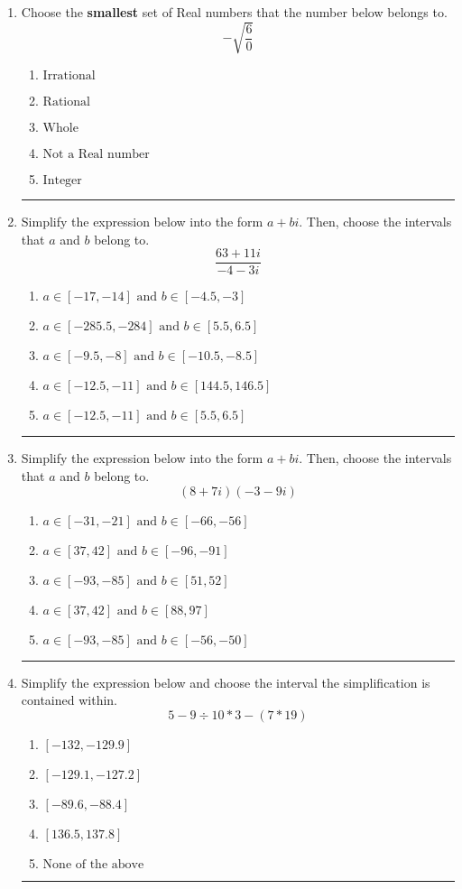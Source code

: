 \documentclass[14pt]{extbook}
\newcommand{\litem}[1]{\item#1\hspace*{-1cm}\rule{\textwidth}{0.4pt}}
\begin{document}
\begin{enumerate}
{\begin{enumerate}[label=\Alph*.]
\end{enumerate} }
\litem{
Choose the \textbf{smallest} set of Real numbers that the number below belongs to.\[ -\sqrt{\frac{6}{0}} \]\begin{enumerate}[label=\Alph*.]
\item \( \text{Irrational} \)
\item \( \text{Rational} \)
\item \( \text{Whole} \)
\item \( \text{Not a Real number} \)
\item \( \text{Integer} \)

\end{enumerate} }
\litem{
Simplify the expression below into the form $a+bi$. Then, choose the intervals that $a$ and $b$ belong to.\[ \frac{63 + 11 i}{-4 - 3 i} \]\begin{enumerate}[label=\Alph*.]
\item \( a \in [-17, -14] \text{ and } b \in [-4.5, -3] \)
\item \( a \in [-285.5, -284] \text{ and } b \in [5.5, 6.5] \)
\item \( a \in [-9.5, -8] \text{ and } b \in [-10.5, -8.5] \)
\item \( a \in [-12.5, -11] \text{ and } b \in [144.5, 146.5] \)
\item \( a \in [-12.5, -11] \text{ and } b \in [5.5, 6.5] \)

\end{enumerate} }
\litem{
Simplify the expression below into the form $a+bi$. Then, choose the intervals that $a$ and $b$ belong to.\[ (8 + 7 i)(-3 - 9 i) \]\begin{enumerate}[label=\Alph*.]
\item \( a \in [-31, -21] \text{ and } b \in [-66, -56] \)
\item \( a \in [37, 42] \text{ and } b \in [-96, -91] \)
\item \( a \in [-93, -85] \text{ and } b \in [51, 52] \)
\item \( a \in [37, 42] \text{ and } b \in [88, 97] \)
\item \( a \in [-93, -85] \text{ and } b \in [-56, -50] \)

\end{enumerate} }
\litem{
Simplify the expression below and choose the interval the simplification is contained within.\[ 5 - 9 \div 10 * 3 - (7 * 19) \]\begin{enumerate}[label=\Alph*.]
\item \( [-132, -129.9] \)
\item \( [-129.1, -127.2] \)
\item \( [-89.6, -88.4] \)
\item \( [136.5, 137.8] \)
\item \( \text{None of the above} \)


\end{enumerate}}
\end{enumerate}
\end{document}
